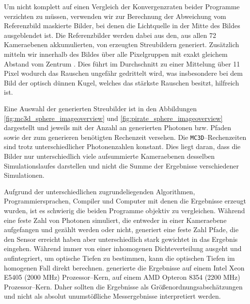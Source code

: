 	Um nicht komplett auf einen Vergleich der Konvergenzraten beider Programme verzichten zu müssen, verwenden wir zur Berechnung der Abweichung vom Referenzbild maskierte Bilder, bei denen die Lichtquelle in der Mitte des Bildes ausgeblendet ist.	 Die Referenzbilder %
	werden dabei aus den, aus allen 72 Kameraebenen akkumulierten, von \mctd erzeugten Streubildern generiert. Zusätzlich mitteln wir innerhalb des Bildes über alle Pixelgruppen mit exakt gleichem Abstand vom Zentrum%
	. Dies führt im Durchschnitt zu einer Mittelung über 11 Pixel wodurch das Rauschen ungefähr gedrittelt wird, was insbesondere bei dem Bild der optisch dünnen Kugel, welches das stärkste Rauschen besitzt, hilfreich ist.
	
		
	
	Eine Auswahl der generierten Streubilder ist in den Abbildungen \ref{fig:mc3d_sphere_imageoverview} und \ref{fig:pirate_sphere_imageoverview} dargestellt und jeweils mit der Anzahl an generierten Photonen bzw. Pfaden sowie der zum generieren benötigten Rechenzeit versehen. Die \texttt{MC3D}--Rechenzeiten sind trotz unterschiedlicher Photonenzahlen konstant. Dies liegt daran, dass die Bilder nur unterschiedlich viele aufsummierte Kameraebenen desselben Simulationslaufes darstellen und nicht die Summe der Ergebnisse verschiedener Simulationen.
	
	Aufgrund der unterschiedlichen zugrundeliegenden Algorithmen, Programmiersprachen, Compiler und Computer mit denen die Ergebnisse erzeugt wurden, ist es schwierig die beiden Programme objektiv zu vergleichen. Während \mctd eine feste Zahl von Photonen simuliert, die entweder in einer Kameraebene aufgefangen und gezählt werden oder nicht, generiert \pirate eine feste Zahl Pfade, die den Sensor erreicht haben aber unterschiedlich stark gewichtet in das Ergebnis eingehen. Während \mctd immer von einer inhomogenen Dichteverteilung ausgeht und aufintegriert, um optische Tiefen zu bestimmen, kann \pirate die optischen Tiefen im homogenen Fall direkt berechnen. \mctd generierte die Ergebnisse auf einem Intel Xeon E5405 (2000 MHz) Prozessor--Kern, \pirate auf einem AMD Opteron 8354 (2200 MHz) Prozessor--Kern. Daher sollten die Ergebnisse als Größenordnungsabschätzungen und nicht als absolut unumstößliche Messergebnisse interpretiert werden.
	
